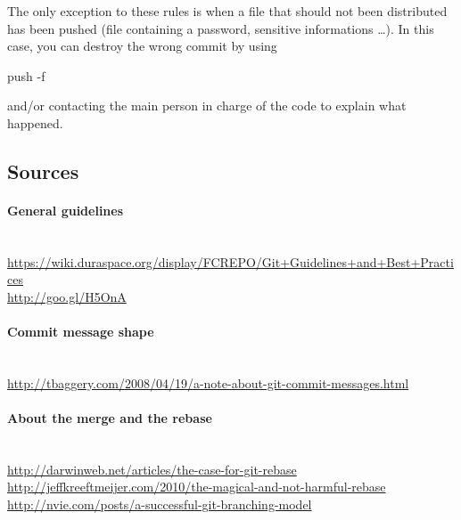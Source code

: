 The only exception to these rules is when a file that should not been distributed has been pushed (file containing a password, sensitive informations \ldots).
In this case, you can destroy the wrong commit by using \begin{tt}push -f\end{tt} and/or contacting the main person in charge of the code to explain what happened.

\subsection{Sources}

\paragraph{General guidelines}~\\
\small{\url{https://wiki.duraspace.org/display/FCREPO/Git+Guidelines+and+Best+Practices}}\\
\small{\url{http://goo.gl/H5OnA}}\\

\paragraph{Commit message shape}~\\
\small{\url{http://tbaggery.com/2008/04/19/a-note-about-git-commit-messages.html}}\\

\paragraph{About the merge and the rebase}~\\
\small{\url{http://darwinweb.net/articles/the-case-for-git-rebase}}\\
\small{\url{http://jeffkreeftmeijer.com/2010/the-magical-and-not-harmful-rebase}}\\
\small{\url{http://nvie.com/posts/a-successful-git-branching-model}}\\
%